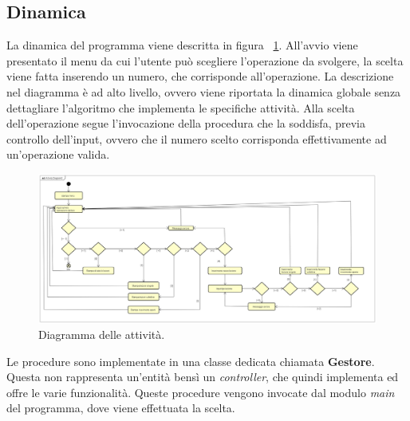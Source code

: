 \subsection{Dinamica}
La dinamica del programma viene descritta in figura \Fig~\ref{fig:ActivityDiagram}. All'avvio viene presentato il menu da cui l'utente può scegliere l'operazione da svolgere, la scelta viene fatta inserendo un numero, che corrisponde all'operazione. La descrizione nel diagramma è ad alto livello, ovvero viene riportata la dinamica globale senza dettagliare l'algoritmo che implementa le specifiche attività. 
Alla scelta dell'operazione segue l'invocazione della procedura che la soddisfa, previa controllo dell'input, ovvero che il numero scelto corrisponda effettivamente ad un'operazione valida.
\begin{figure}[ht]
	\centering
	\includegraphics[width=0.8\linewidth]{ImageFiles/c++/ActivityDiagram}
	\caption{Diagramma delle attività.}
	\label{fig:ActivityDiagram}
\end{figure}
Le procedure sono implementate in una classe dedicata chiamata \textbf{Gestore}. Questa non rappresenta un'entità bensì un \textit{controller}, che quindi implementa ed offre le varie funzionalità. Queste procedure vengono invocate dal modulo \textit{main} del programma, dove viene effettuata la scelta.

